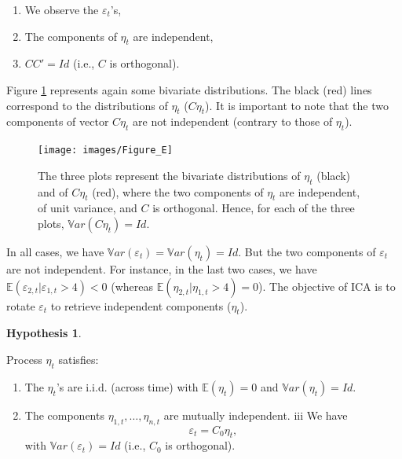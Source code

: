 \documentclass[
  12pt,
]{book}
\providecommand{\tightlist}{%
  \setlength{\itemsep}{0pt}\setlength{\parskip}{0pt}}
\theoremstyle{definition}
\theoremstyle{definition}
\theoremstyle{definition}
\theoremstyle{definition}
\newtheorem{hypothesis}{Hypothesis}[chapter]
\theoremstyle{remark}
\begin{document}
\begin{enumerate}
\def\labelenumi{\roman{enumi}.}
\tightlist
\item
  We observe the \(\varepsilon_t\)'s,
\item
  The components of \(\eta_t\) are independent,
\item
  \(CC'=Id\) (i.e., \(C\) is orthogonal).
\end{enumerate}

Figure \ref{fig:ThreePlots} represents again some bivariate distributions. The black (red) lines correspond to the distributions of \(\eta_t\) (\(C\eta_t\)). It is important to note that the two components of vector \(C \eta_t\) are not independent (contrary to those of \(\eta_t\)).

\begin{figure}

\texttt{[image: images/Figure\_E]} \hfill{}

\caption{The three plots represent the bivariate distributions of $\eta_t$ (black) and of $C\eta_t$ (red), where the two components of $\eta_t$ are independent, of unit variance, and $C$ is orthogonal. Hence, for each of the three plots, $\mathbb{V}ar(C\eta_t)=Id$.}\label{fig:ThreePlots}
\end{figure}

In all cases, we have \(\mathbb{V}ar(\varepsilon_t)=\mathbb{V}ar(\eta_t)=Id\). But the two components of \(\varepsilon_t\) are not independent. For instance, in the last two cases, we have \(\mathbb{E}(\varepsilon_{2,t}|\varepsilon_{1,t}>4)<0\) (whereas \(\mathbb{E}(\eta_{2,t}|\eta_{1,t}>4)=0\)). The objective of ICA is to rotate \(\varepsilon_t\) to retrieve independent components (\(\eta_t\)).

\begin{hypothesis}
\protect\hypertarget{hyp:NonGauss}{}\label{hyp:NonGauss}

Process \(\eta_t\) satisfies:

\begin{enumerate}
\def\labelenumi{\roman{enumi}.}
\tightlist
\item
  The \(\eta_t\)'s are i.i.d. (across time) with \(\mathbb{E}(\eta_t) = 0\) and \(\mathbb{V}ar(\eta_t) = Id.\)
\item
  The components \(\eta_{1,t}, \ldots, \eta_{n,t}\) are mutually independent.
  iii We have
  \[
  \varepsilon_t = C_0 \eta_t,
  \]
  with \(\mathbb{V}ar(\varepsilon_t) = Id\) (i.e., \(C_0\) is orthogonal).
\end{enumerate}

\end{hypothesis}
\end{document}
